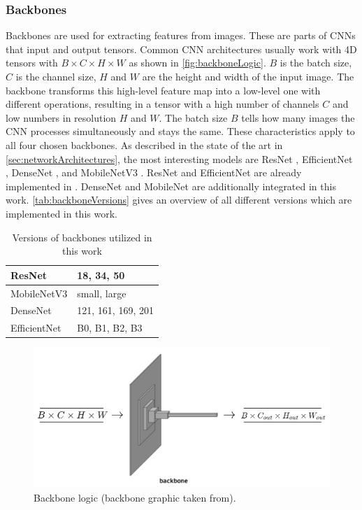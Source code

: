 \subsubsection{Backbones}

Backbones are used for extracting features from images.
These are parts of \ac{CNN}s that input and output tensors.
Common \ac{CNN} architectures usually work with 4D tensors with $B \times C \times H \times W$ as shown in \autoref{fig:backboneLogic}.
$B$ is the batch size, $C$ is the channel size, $H$ and $W$ are the height and width of the input image.
The backbone transforms this high-level feature map into a low-level one with different operations, resulting in a tensor with a high number of channels $C$ and low numbers in resolution $H$ and $W$.
The batch size $B$ tells how many images the \ac{CNN} processes simultaneously and stays the same.
These characteristics apply to all four chosen backbones.
As described in the state of the art in \autoref{sec:networkArchitectures}, the most interesting models are ResNet \cite{ResNet}, EfficientNet \cite{EfficientNet}, DenseNet \cite{DenseNets}, and MobileNetV3 \cite{MobileNetV3}.
ResNet and EfficientNet are already implemented in \cite{tepNet2024}.
DenseNet and MobileNet are additionally integrated in this work.
\autoref{tab:backboneVersions} gives an overview of all different versions which are implemented in this work.

\begin{table}[H]
    \centering
    \begin{tabular}{|l|l|}
        \hline
        ResNet & 18, 34, 50\\
        \hline
        MobileNetV3 & small, large\\
        \hline
        DenseNet & 121, 161, 169, 201\\
        \hline
        EfficientNet & B0, B1, B2, B3\\
        \hline
    \end{tabular}
    \caption{Versions of backbones utilized in this work}
    \label{tab:backboneVersions}
\end{table}

\begin{figure}[H]
    \centering
    \includegraphics[width=0.6\linewidth]{PICs/improvedModel/backbone_logic.jpg}
    \caption{Backbone logic (backbone graphic taken from\cite{tepNet2024}).}
    \label{fig:backboneLogic}
\end{figure}

